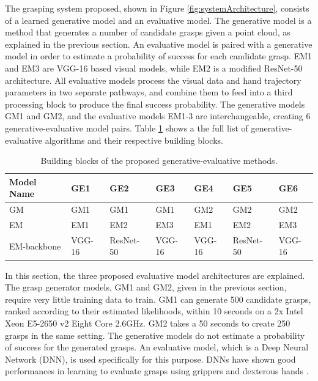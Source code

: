 The grasping system proposed, shown in Figure \ref{fig:systemArchitecture}, consists of a learned generative model and an evaluative model. The generative model is a method that generates a number of candidate grasps given a point cloud, as explained in the previous section. An evaluative model is paired with a generative model in order to estimate a probability of success for each candidate grasp. EM1 and EM3 are VGG-16 based visual models, while EM2 is a modified ResNet-50 architecture. All evaluative models process the visual data and hand trajectory parameters in two separate pathways, and combine them to feed into a third processing block to produce the final success probability. The generative models GM1 and GM2, and the evaluative models EM1-3 are interchangeable, creating 6 generative-evaluative model pairs. Table \ref{table:GEBreakdown} shows a the full list of generative-evaluative algorithms and their respective building blocks.

\begin{table}[]
\centering
\begin{tabular}{|l|l|l|l|l|l|l|}
\hline
Model Name & GE1 & GE2 & GE3 & GE4 & GE5 & GE6 \\ \hline
GM         & GM1 & GM1 & GM1 & GM2 & GM2 & GM2 \\ \hline
EM         & EM1 & EM2 & EM3 & EM1 & EM2 & EM3 \\ \hline
EM-backbone & VGG-16 & ResNet-50 & VGG-16 & VGG-16 & ResNet-50 & VGG-16 \\ \hline
\end{tabular}
\caption{Building blocks of the proposed generative-evaluative methods.}
\label{table:GEBreakdown}
\end{table}

In this section, the three proposed evaluative model architectures are explained. The grasp generator models, GM1 and GM2, given in the previous section, require very little training data to train. GM1 can generate 500 candidate grasps, ranked according to their estimated likelihoods, within 10 seconds on a 2x Intel Xeon E5-2650 v2 Eight Core 2.6GHz. GM2 takes a 50 seconds to create 250 grasps in the same setting. The generative models do not estimate a probability of success for the generated grasps. An evaluative model, which is a Deep Neural Network (DNN), is used specifically for this purpose. DNNs have shown good performances in learning to evaluate grasps using grippers \cite{levine16,lenz2015deep} and dexterous hands \cite{varley2015generating,lu2017planning}.

